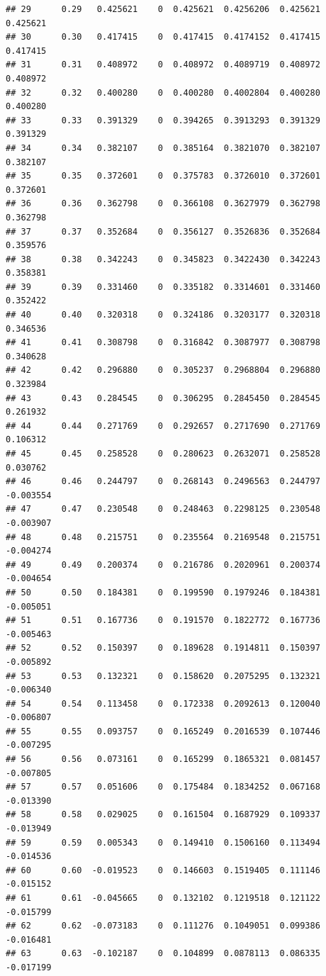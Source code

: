 \documentclass{article}\usepackage[]{graphicx}\usepackage[]{color}
\makeatletter
\newenvironment{kframe}{%
 \def\at@end@of@kframe{}%
 \ifinner\ifhmode%
  \def\at@end@of@kframe{\end{minipage}}%
  \begin{minipage}{\columnwidth}%
 \fi\fi%
 \def\FrameCommand##1{\hskip\@totalleftmargin \hskip-\fboxsep
 \colorbox{shadecolor}{##1}\hskip-\fboxsep
     \hskip-\linewidth \hskip-\@totalleftmargin \hskip\columnwidth}%
 \MakeFramed {\advance\hsize-\width
   \@totalleftmargin\z@ \linewidth\hsize
   \@setminipage}}%
 {\par\unskip\endMakeFramed%
 \at@end@of@kframe}
\newenvironment{knitrout}{}{} %
\makeatother
\begin{document}
\begin{knitrout}
\begin{kframe}
\begin{verbatim}
## 29      0.29   0.425621    0  0.425621  0.4256206  0.425621    0.425621
## 30      0.30   0.417415    0  0.417415  0.4174152  0.417415    0.417415
## 31      0.31   0.408972    0  0.408972  0.4089719  0.408972    0.408972
## 32      0.32   0.400280    0  0.400280  0.4002804  0.400280    0.400280
## 33      0.33   0.391329    0  0.394265  0.3913293  0.391329    0.391329
## 34      0.34   0.382107    0  0.385164  0.3821070  0.382107    0.382107
## 35      0.35   0.372601    0  0.375783  0.3726010  0.372601    0.372601
## 36      0.36   0.362798    0  0.366108  0.3627979  0.362798    0.362798
## 37      0.37   0.352684    0  0.356127  0.3526836  0.352684    0.359576
## 38      0.38   0.342243    0  0.345823  0.3422430  0.342243    0.358381
## 39      0.39   0.331460    0  0.335182  0.3314601  0.331460    0.352422
## 40      0.40   0.320318    0  0.324186  0.3203177  0.320318    0.346536
## 41      0.41   0.308798    0  0.316842  0.3087977  0.308798    0.340628
## 42      0.42   0.296880    0  0.305237  0.2968804  0.296880    0.323984
## 43      0.43   0.284545    0  0.306295  0.2845450  0.284545    0.261932
## 44      0.44   0.271769    0  0.292657  0.2717690  0.271769    0.106312
## 45      0.45   0.258528    0  0.280623  0.2632071  0.258528    0.030762
## 46      0.46   0.244797    0  0.268143  0.2496563  0.244797   -0.003554
## 47      0.47   0.230548    0  0.248463  0.2298125  0.230548   -0.003907
## 48      0.48   0.215751    0  0.235564  0.2169548  0.215751   -0.004274
## 49      0.49   0.200374    0  0.216786  0.2020961  0.200374   -0.004654
## 50      0.50   0.184381    0  0.199590  0.1979246  0.184381   -0.005051
## 51      0.51   0.167736    0  0.191570  0.1822772  0.167736   -0.005463
## 52      0.52   0.150397    0  0.189628  0.1914811  0.150397   -0.005892
## 53      0.53   0.132321    0  0.158620  0.2075295  0.132321   -0.006340
## 54      0.54   0.113458    0  0.172338  0.2092613  0.120040   -0.006807
## 55      0.55   0.093757    0  0.165249  0.2016539  0.107446   -0.007295
## 56      0.56   0.073161    0  0.165299  0.1865321  0.081457   -0.007805
## 57      0.57   0.051606    0  0.175484  0.1834252  0.067168   -0.013390
## 58      0.58   0.029025    0  0.161504  0.1687929  0.109337   -0.013949
## 59      0.59   0.005343    0  0.149410  0.1506160  0.113494   -0.014536
## 60      0.60  -0.019523    0  0.146603  0.1519405  0.111146   -0.015152
## 61      0.61  -0.045665    0  0.132102  0.1219518  0.121122   -0.015799
## 62      0.62  -0.073183    0  0.111276  0.1049051  0.099386   -0.016481
## 63      0.63  -0.102187    0  0.104899  0.0878113  0.086335   -0.017199

\end{verbatim}
\end{kframe}
\end{knitrout}
\end{document}
